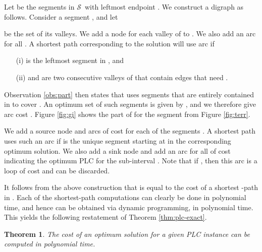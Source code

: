 \documentclass[11pt]{article}
\newtheorem{theorem}{Theorem}
\newcommand{\ess}{\ensuremath{\mathcal{S}}}
\newcommand{\1}{\mathbb{1}}
\begin{document}
{Let  be the segments in \ess\ with leftmost endpoint .  We
construct a digraph  as follows.  Consider a segment , and let

be the set of its valleys. We add a node  for each valley  of  to . We also add an arc
 for all .
A shortest path corresponding to the solution  will use arc
 if 
\begin{itemize}
\item[(i)]  is the leftmost segment in , and
\item[(ii)]  and  are two consecutive valleys 
  of  that contain edges that need . 
\end{itemize}
Observation \ref{obs:part} then states that  uses segments 
that are entirely contained in  to cover .
An optimum set of such segments is given by ,
and we therefore give arc  cost .
Figure \ref{fig:gi} shows the part of  for the segment  from 
Figure \ref{fig:terr}.

We add a source node  and arcs  of cost
 for each of the segments . A shortest path uses
such an arc if  is the unique segment starting at  in the
corresponding optimum solution. 
We also add a sink node  and add an arc  for all 
of cost  indicating the optimum PLC for the sub-interval .
Note that if , then this arc is a loop of cost  and can be discarded.

It follows from the above construction that  is equal to
the cost of a shortest -path in .  Each of the
shortest-path computations can clearly be done in polynomial time, and
hence  can be obtained via dynamic programming, in
polynomial time.  This yields the following restatement of 
Theorem \ref{thm:plc-exact}.

\begin{theorem}
  The cost  of an optimum solution for a given PLC instance
  can be computed in polynomial time.
\end{theorem}
}
\end{document}
